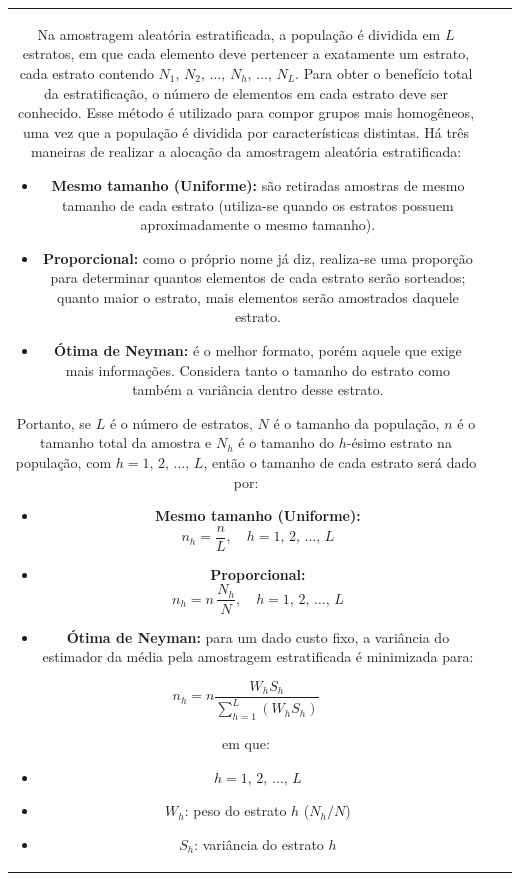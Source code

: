 \documentclass[
]{estat/estat}
\providecommand{\tightlist}{%
  \setlength{\itemsep}{0pt}\setlength{\parskip}{0pt}}\usepackage{longtable,booktabs,array}
\begin{document}
\begin{tabular}{c|cc}
Na amostragem aleatória estratificada, a população é dividida em \(L\)
estratos, em que cada elemento deve pertencer a exatamente um estrato,
cada estrato contendo
\(N_1, \, N_2, \, \ldots, \, N_h, \, \ldots, \, N_L\). Para obter o
benefício total da estratificação, o número de elementos em cada estrato
deve ser conhecido. Esse método é utilizado para compor grupos mais
homogêneos, uma vez que a população é dividida por características
distintas. Há três maneiras de realizar a alocação da amostragem
aleatória estratificada:

\begin{itemize}
\tightlist
\item
  \textbf{Mesmo tamanho (Uniforme):} são retiradas amostras de mesmo
  tamanho de cada estrato (utiliza-se quando os estratos possuem
  aproximadamente o mesmo tamanho).
\item
  \textbf{Proporcional:} como o próprio nome já diz, realiza-se uma
  proporção para determinar quantos elementos de cada estrato serão
  sorteados; quanto maior o estrato, mais elementos serão amostrados
  daquele estrato.
\item
  \textbf{Ótima de Neyman:} é o melhor formato, porém aquele que exige
  mais informações. Considera tanto o tamanho do estrato como também a
  variância dentro desse estrato.
\end{itemize}

Portanto, se \(L\) é o número de estratos, \(N\) é o tamanho da
população, \(n\) é o tamanho total da amostra e \(N_h\) é o tamanho do
\(h\)-ésimo estrato na população, com \(h=1, \, 2, \, \ldots, \, L\),
então o tamanho de cada estrato será dado por:

\begin{itemize}
\tightlist
\item
  \textbf{Mesmo tamanho (Uniforme):} \[
  n_h = \frac{n}{L} , \quad h=1, \, 2, \, \ldots, \, L 
  \]
\item
  \textbf{Proporcional:} \[
  n_h = n \, \frac{N_h}{N} , \quad h=1, \, 2, \, \ldots, \, L 
  \]
\item
  \textbf{Ótima de Neyman:} para um dado custo fixo, a variância do
  estimador da média pela amostragem estratificada é minimizada para:
\end{itemize}

\[
n_h = n \frac{W_h S_h}{\sum_{h=1}^{L} (W_h S_h)}
\]

em que:

\begin{itemize}
\tightlist
\item
  \(h=1, \, 2, \, \ldots, \, L\)
\item
  \(W_h\): peso do estrato \(h\) (\(N_h/N\))
\item
  \(S_h\): variância do estrato \(h\)
\end{itemize}


\end{tabular}
\end{document}
